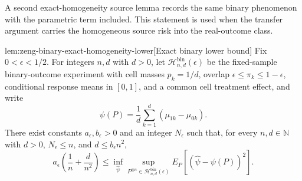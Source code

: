 \documentclass[11pt]{article}
\begin{document}
A second exact-homogeneity source lemma records the same binary phenomenon with the parametric term included. This statement is used when the transfer argument carries the homogeneous source risk into the real-outcome class.

\begin{lemmav}{lem:zeng-binary-exact-homogeneity-lower}[Exact binary lower bound]
Fix \(0<\epsilon<1/2\).  For integers \(n,d\) with \(d>0\), let \(\mathcal H_{n,d}^{\mathrm{bin}}(\epsilon)\) be the fixed-sample binary-outcome experiment with cell masses \(p_k=1/d\), overlap \(\epsilon\le \pi_k\le 1-\epsilon\), conditional response means in \([0,1]\), and a common cell treatment effect, and write
\[
\psi(P)=\frac{1}{d}\sum_{k=1}^d(\mu_{1k}-\mu_{0k}).
\]
There exist constants \(a_\epsilon,b_\epsilon>0\) and an integer \(N_\epsilon\) such that, for every \(n,d\in\mathbb N\) with \(d>0\), \(N_\epsilon\le n\), and \(d\le b_\epsilon n^2\),
\[
a_\epsilon\left(\frac{1}{n}+\frac{d}{n^2}\right)
\le
\inf_{\widehat\psi}\sup_{P^{\otimes n}\in\mathcal H_{n,d}^{\mathrm{bin}}(\epsilon)}
E_P\!\left[(\widehat\psi-\psi(P))^2\right].
\]
\end{lemmav}
\end{document}
